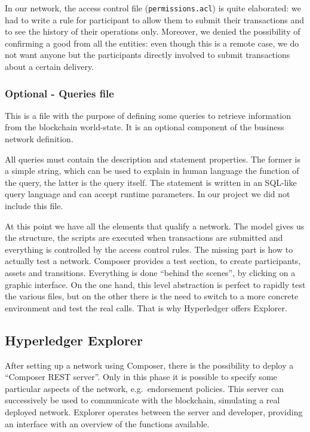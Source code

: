 In our network, the access control file (\texttt{permissions.acl}) is quite elaborated: we had to write a rule for participant to allow them to submit their transactions and to see the history of their operations only. Moreover, we denied the possibility of confirming a good from all the entities: even though this is a remote case, we do not want anyone but the participants directly involved to submit transactions about a certain delivery.

\subsubsection{Optional - Queries file}
This is a file with the purpose of defining some queries to retrieve information from the blockchain world-state. It is an optional component of the business network definition. 

All queries must contain the description and statement properties. The former is a simple string, which can be used to explain in human language the function of the query, the latter is the query itself. The statement is written in an SQL-like query language and can accept runtime parameters. In our project we did not include this file.
\vspace{11pt}

At this point we have all the elements that qualify a network. The model gives us the structure, the scripts are executed when transactions are submitted and everything is controlled by the access control rules. The missing part is how to actually test a network. Composer provides a test section, to create participants, assets and transitions. Everything is done ``behind the scenes'', by clicking on a graphic interface. On the one hand, this level abstraction is perfect to rapidly test the various files, but on the other there is the need to switch to a more concrete environment and test the real calls. That is why Hyperledger offers Explorer.

\subsection{Hyperledger Explorer}
After setting up a network using Composer, there is the possibility to deploy a ``Composer REST server''. Only in this phase it is possible to specify some particular aspects of the network, e.g.\ endorsement policies. This server can successively be used to communicate with the blockchain, simulating a real deployed network. Explorer operates between the server and developer, providing an interface with an overview of the functions available. 


